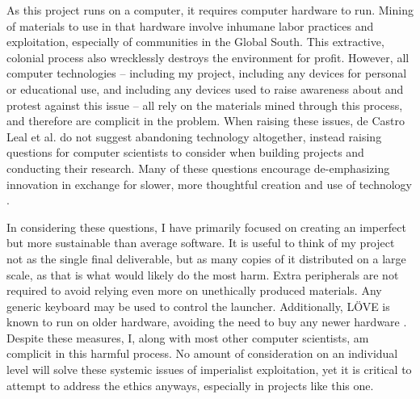 \documentclass[10pt,twocolumn]{article}
\begin{document}
As this project runs on a computer, it requires computer hardware to run.
Mining of materials to use in that
hardware involve inhumane labor practices and exploitation, especially of
communities in the Global South. This extractive, colonial process also
wrecklessly destroys the environment for profit. However, all computer
technologies -- including my project, including any devices for personal or
educational use, and including any devices used to raise awareness about and
protest against this issue -- all rely on the materials mined through this
process, and therefore are complicit in the problem. When raising these issues,
de Castro Leal et al. do not suggest abandoning technology altogether, instead
raising questions for computer scientists to consider when building projects and
conducting their research. Many of these questions encourage de-emphasizing
innovation in exchange for slower, more thoughtful creation and use of
technology \cite{de_castro_leal_into_2021}.

In considering these questions, I have primarily focused on creating an
imperfect but more sustainable than average software. It is useful to think
of my project not as the single final deliverable, but as many copies of it
distributed on a large scale, as that is what would likely do the most harm.
Extra peripherals are not required to avoid relying even more on unethically
produced materials. Any generic keyboard may be used to control the launcher.
Additionally, LÖVE is known to run on older hardware, avoiding the need to
buy any newer hardware \cite{noauthor_love_nodate}.
Despite these measures, I, along with most other computer scientists,
am complicit in this harmful process. No amount of consideration on an
individual level will solve these systemic issues of imperialist exploitation,
yet it is critical to attempt to address the ethics anyways, especially in
projects like this one.
\end{document}

